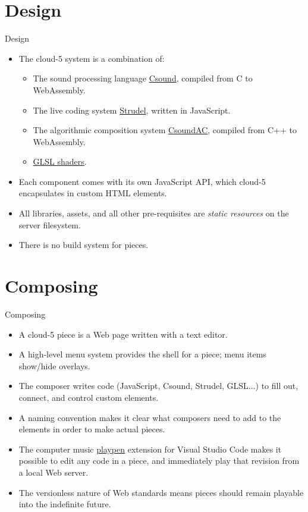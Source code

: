\documentclass{beamer}
\begin{document}
\section{Design}
\begin{frame}{Design}
\begin{itemize}
\item The cloud-5 system is a combination of:
\begin{itemize}
\item The sound processing language \href{https://csound.com/}{Csound}, compiled from C to WebAssembly.
\item The live coding system \href{https://strudel.cc}{Strudel}, written in JavaScript.
\item The algorithmic composition system \href{https://github.com/gogins/csound-ac/blob/master/README.md}{CsoundAC}, compiled from C++ to WebAssembly.
\item \href{https://www.shadertoy.com/}{GLSL shaders}.
\end{itemize}
\item Each component comes with its own JavaScript API, which cloud-5 encapsulates in custom HTML elements.
\item All libraries, assets, and all other pre-requisites are \emph{static resources} on the server filesystem.
\item There is no build system for pieces.

\end{itemize}
\end{frame}

\section{Composing}

\begin{frame}{Composing}
\begin{itemize}
\item A cloud-5 piece is a Web page written with a text editor.
\item A high-level menu system provides the shell for a piece; menu items show/hide overlays.
\item The composer writes code (JavaScript, Csound, Strudel, GLSL...) to fill out, connect, and control custom elements.
\item A naming convention makes it clear what composers need to add to the elements in order to make actual pieces.
\item The computer music \href{https://github.com/gogins/csound-ac/tree/master/vscode-playpen}{playpen} extension for Visual Studio Code makes it possible to edit any code in a piece, and immediately play that revision from a local Web server.
\item The versionless nature of Web standards means pieces should remain playable into the indefinite future.
\end{itemize}
\end{frame}
\end{document}

